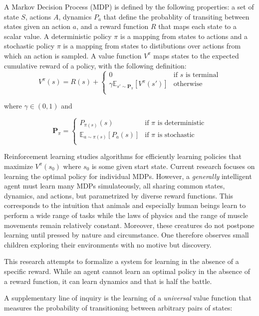 \documentclass{article}
\begin{document}
A Markov Decision Process (MDP) is defined by the following properties: a set of state $S$, actions $A$, dynamics $P_a$ that define the probablity of transiting between states given an action $a$, and a reward function $R$ that maps each state to a scalar value. A deterministic policy $\pi$ is a mapping from states to actions and a stochastic policy $\pi$ is a mapping from states to distibutions over actions from which an action is sampled. A value function $V^\pi$ maps states to the expected cumulative reward of a policy, with the following definition:
\[
  V^\pi(s) = R(s) +
  \begin{cases}
    0 & \text{if $s$ is terminal}\\ 
    \gamma \mathbb{E}_{s' \sim \bm{P}_\pi} \left[ V^\pi(s') \right] & \text{otherwise} \\ 
  \end{cases}
\]

where $\gamma \in (0, 1)$ and

\[
  \bm{P}_\pi = 
  \begin{cases}
    P_{\pi(s)}(s) & \text{if $\pi$ is deterministic} \\
    \mathbb{E}_{a \sim \pi(s)}\left[ P_a(s) \right] & \text{if $\pi$ is stochastic} \\
  \end{cases}
\]

Reinforcement learning studies algorithms for efficiently learning policies that maximize $V^\pi(s_0)$ where $s_0$ is some given start state. Current research focuses on learning the optimal policy for individual MDPs. However, a \textit{generally} intelligent agent must learn many MDPs simulateously, all sharing common states, dynamics, and actions, but parametrized by diverse reward functions. This corresponds to the intuition that animals and especially human beings learn to perform a wide range of tasks while the laws of physics and the range of muscle movements remain relatively constant. Moreover, these creatures do not postpone learning until pressed by nature and circumstance. One therefore observes small children exploring their environments with no motive but discovery.

This research attempts to formalize a system for learning in the absence of a specific reward. While an agent cannot learn an optimal policy in the absence of a reward function, it can learn dynamics and that is half the battle. 

A supplementary line of inquiry is the learning of a \textit{universal} value function that measures the probability of transitioning between arbitrary pairs of states:
\end{document}
